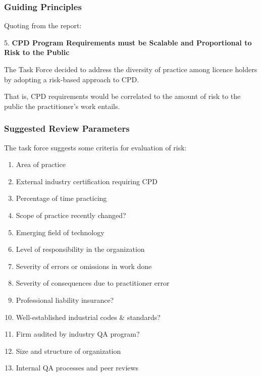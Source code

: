 \begin{frame}
\frametitle{Guiding Principles}

Quoting from the report:


5. \textbf{CPD Program Requirements must be Scalable and Proportional to Risk to the Public}

The Task Force decided to address the diversity of practice among licence holders by adopting a risk-based approach to CPD. 

That is, CPD requirements would be correlated to the amount of risk to the public the practitioner's work entails. 

\end{frame}




\begin{frame}
\frametitle{Suggested Review Parameters}

The task force suggests some criteria for evaluation of risk:

\begin{enumerate}
	\item Area of practice
	\item External industry certification requiring CPD
	\item Percentage of time practicing
	\item Scope of practice recently changed?
	\item Emerging field of technology
	\item Level of responsibility in the organization
	\item Severity of errors or omissions in work done
	\item Severity of consequences due to practitioner error
	\item Professional liability insurance?
	\item Well-established industrial codes \& standards?
	\item Firm audited by industry QA program?
	\item Size and structure of organization
	\item Internal QA processes and peer reviews
\end{enumerate} 


\end{frame}



